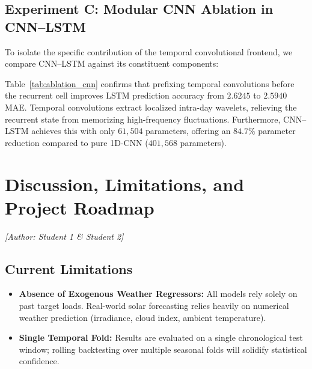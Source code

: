 \documentclass[11pt,a4paper]{article}
\begin{document}
\subsection{Experiment C: Modular CNN Ablation in CNN--LSTM}
To isolate the specific contribution of the temporal convolutional frontend, we compare CNN--LSTM against its constituent components:
\begin{table}[H]
\centering
\small
\caption{Modular Convolutional Frontend Ablation on Electricity Demand ($L=48, H=24$).}
\label{tab:ablation_cnn}
\end{table}
Table~\ref{tab:ablation_cnn} confirms that prefixing temporal convolutions before the recurrent cell improves LSTM prediction accuracy from $2.6245$ to $2.5940$ MAE. Temporal convolutions extract localized intra-day wavelets, relieving the recurrent state from memorizing high-frequency fluctuations. Furthermore, CNN--LSTM achieves this with only $61,504$ parameters, offering an $84.7\%$ parameter reduction compared to pure 1D-CNN ($401,568$ parameters).

\section{Discussion, Limitations, and Project Roadmap}
\label{sec:discussion}
\noindent\textit{[Author: Student 1 \& Student 2]}

\subsection{Current Limitations}
\begin{itemize}
    \item \textbf{Absence of Exogenous Weather Regressors:} All models rely solely on past target loads. Real-world solar forecasting relies heavily on numerical weather prediction (irradiance, cloud index, ambient temperature).
    \item \textbf{Single Temporal Fold:} Results are evaluated on a single chronological test window; rolling backtesting over multiple seasonal folds will solidify statistical confidence.
\end{itemize}
\end{document}
